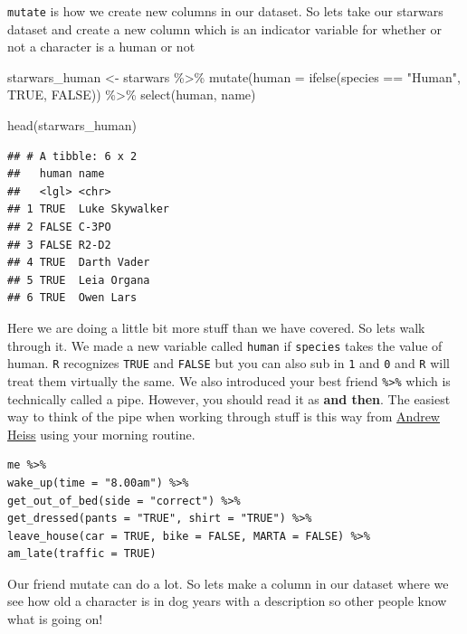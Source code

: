 \documentclass[]{tufte-handout}
\newenvironment{Shaded}{}{}
\newcommand{\AttributeTok}[1]{\textcolor[rgb]{0.49,0.56,0.16}{#1}}
\newcommand{\ConstantTok}[1]{\textcolor[rgb]{0.53,0.00,0.00}{#1}}
\newcommand{\FunctionTok}[1]{\textcolor[rgb]{0.02,0.16,0.49}{#1}}
\newcommand{\NormalTok}[1]{#1}
\newcommand{\OtherTok}[1]{\textcolor[rgb]{0.00,0.44,0.13}{#1}}
\newcommand{\SpecialCharTok}[1]{\textcolor[rgb]{0.25,0.44,0.63}{#1}}
\newcommand{\StringTok}[1]{\textcolor[rgb]{0.25,0.44,0.63}{#1}}
\begin{document}
\texttt{mutate} is how we create new columns in our dataset. So lets
take our starwars dataset and create a new column which is an indicator
variable for whether or not a character is a human or not

\begin{Shaded}
\begin{Highlighting}[]
\NormalTok{starwars\_human }\OtherTok{\textless{}{-}}\NormalTok{ starwars }\SpecialCharTok{\%\textgreater{}\%}
  \FunctionTok{mutate}\NormalTok{(}\AttributeTok{human =} \FunctionTok{ifelse}\NormalTok{(species }\SpecialCharTok{==} \StringTok{"Human"}\NormalTok{, }\ConstantTok{TRUE}\NormalTok{, }\ConstantTok{FALSE}\NormalTok{)) }\SpecialCharTok{\%\textgreater{}\%}
  \FunctionTok{select}\NormalTok{(human, name)}

\FunctionTok{head}\NormalTok{(starwars\_human)}
\end{Highlighting}
\end{Shaded}

\begin{verbatim}
## # A tibble: 6 x 2
##   human name          
##   <lgl> <chr>         
## 1 TRUE  Luke Skywalker
## 2 FALSE C-3PO         
## 3 FALSE R2-D2         
## 4 TRUE  Darth Vader   
## 5 TRUE  Leia Organa   
## 6 TRUE  Owen Lars
\end{verbatim}

Here we are doing a little bit more stuff than we have covered. So lets
walk through it. We made a new variable called \texttt{human} if
\texttt{species} takes the value of human. \texttt{R} recognizes
\texttt{TRUE} and \texttt{FALSE} but you can also sub in \texttt{1} and
\texttt{0} and \texttt{R} will treat them virtually the same. We also
introduced your best friend \texttt{\%\textgreater{}\%} which is
technically called a pipe. However, you should read it as \textbf{and
then}. The easiest way to think of the pipe when working through stuff
is this way from
\href{https://twitter.com/andrewheiss/status/1359583543509348356?lang=en}{Andrew
Heiss} using your morning routine.

\begin{verbatim}
me %>% 
wake_up(time = "8.00am") %>% 
get_out_of_bed(side = "correct") %>% 
get_dressed(pants = "TRUE", shirt = "TRUE") %>% 
leave_house(car = TRUE, bike = FALSE, MARTA = FALSE) %>% 
am_late(traffic = TRUE)
\end{verbatim}

Our friend mutate can do a lot. So lets make a column in our dataset
where we see how old a character is in dog years with a description so
other people know what is going on!
\end{document}
